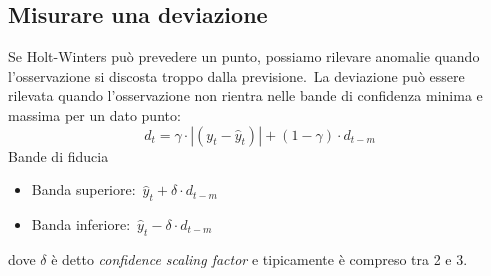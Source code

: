 \subsection{Misurare una deviazione}

Se Holt-Winters può prevedere un punto, possiamo rilevare anomalie quando l'osservazione si discosta troppo dalla previsione.\
La deviazione può essere rilevata quando l'osservazione non rientra nelle bande di confidenza minima e massima per un dato punto:
\[d_t= \gamma \cdot |(y_t-\hat{y}_t)| + (1-\gamma) \cdot d_{t-m}\]
Bande di fiducia
\begin{itemize}
    \item Banda superiore:\ $\hat{y}_t+\delta \cdot d_{t-m}$
    \item Banda inferiore:\  $\hat{y}_t - \delta \cdot d_{t-m}$
\end{itemize}
dove $\delta$ è detto \textit{confidence scaling factor} e tipicamente è compreso tra 2 e 3.\
